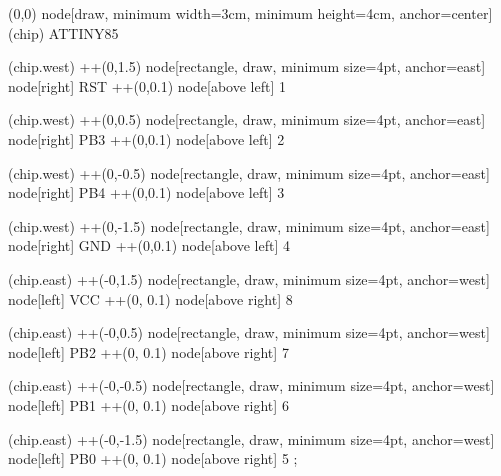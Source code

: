     (0,0) node[draw, minimum width=3cm, minimum height=4cm, anchor=center] (chip) {ATTINY85}

    (chip.west)  ++(0,1.5)
    node[rectangle, draw,   minimum size=4pt, anchor=east] {}
    node[right] {RST} 
    ++(0,0.1)
    node[above left] {1} 

   
    (chip.west) ++(0,0.5) 
    node[rectangle, draw,   minimum size=4pt, anchor=east] {}  
    node[right] {PB3} 
    ++(0,0.1)
    node[above left] {2}  
     
    (chip.west)   ++(0,-0.5) 
    node[rectangle, draw,   minimum size=4pt, anchor=east] {}
    node[right] {PB4} 
    ++(0,0.1)
    node[above left] {3} 

    
    (chip.west) ++(0,-1.5) 
    node[rectangle, draw,   minimum size=4pt, anchor=east] {} %
    node[right] {GND} 
    ++(0,0.1)
    node[above left] {4} 
 



    (chip.east)  ++(-0,1.5) 
    node[rectangle, draw,   minimum size=4pt, anchor=west] {} %
    node[left] {VCC}
    ++(0, 0.1)
    node[above right] {8} 
      
   
    
    (chip.east) ++(-0,0.5)
    node[rectangle, draw,   minimum size=4pt, anchor=west] {}  
    node[left] {PB2}
    ++(0, 0.1)
    node[above right] {7} 

 
    
    (chip.east)   ++(-0,-0.5) 
    node[rectangle, draw,   minimum size=4pt, anchor=west] {} 
    node[left] {PB1}
    ++(0, 0.1)
    node[above right] {6} 
        
 
    
    (chip.east)  ++(-0,-1.5) 
    node[rectangle, draw,   minimum size=4pt, anchor=west] {} 
    node[left] {PB0}
    ++(0, 0.1)
    node[above right] {5}  ;
